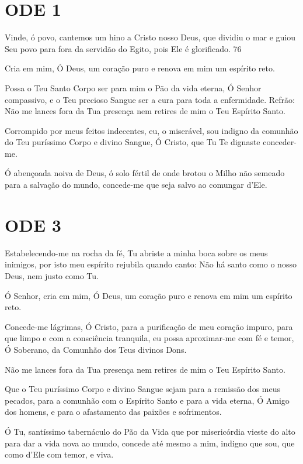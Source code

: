 \documentclass{subfiles}
\begin{document}
\section*{ODE 1}

\eirmos{}Vinde, ó povo, cantemos um hino a Cristo nosso Deus, que dividiu o mar
e guiou Seu povo para fora da servidão do Egito, pois Ele é glorificado.
76

Cria em mim, Ó Deus, um coração puro e renova em mim um espírito reto.

Possa o Teu Santo Corpo ser para mim o Pão da vida eterna, Ó Senhor compassivo,
e o Teu precioso Sangue ser a cura para toda a enfermidade. Refrão: Não me
lances fora da Tua presença nem retires de mim o Teu Espírito Santo.

Corrompido por meus feitos indecentes, eu, o miserável, sou indigno da comunhão
do Teu puríssimo Corpo e divino Sangue, Ó Cristo, que Tu Te dignaste
conceder-me.

\Doxology{}

Ó abençoada noiva de Deus, ó solo fértil de onde brotou o Milho não semeado para
a salvação do mundo, concede-me que seja salvo ao comungar d’Ele.

\section*{ODE 3}

\eirmos{}Estabelecendo-me na rocha da fé, Tu abriste a minha boca sobre os meus
inimigos, por isto meu espírito rejubila quando canto: Não há santo como o nosso
Deus, nem justo como Tu.

Ó Senhor, cria em mim, Ó Deus, um coração puro e renova em mim um espírito reto.

Concede-me lágrimas, Ó Cristo, para a purificação de meu coração impuro, para
que limpo e com a consciência tranquila, eu possa aproximar-me com fé e temor, Ó
Soberano, da Comunhão dos Teus divinos Dons.

Não me lances fora da Tua presença nem retires de mim o Teu Espírito Santo.

Que o Teu puríssimo Corpo e divino Sangue sejam para a remissão dos meus
pecados, para a comunhão com o Espírito Santo e para a vida eterna, Ó Amigo dos
homens, e para o afastamento das paixões e sofrimentos.

\Doxology{}

Ó Tu, santíssimo tabernáculo do Pão da Vida que por misericórdia vieste do alto
para dar a vida nova ao mundo, concede até mesmo a mim, indigno que sou, que
como d’Ele com temor, e viva.
\end{document}
